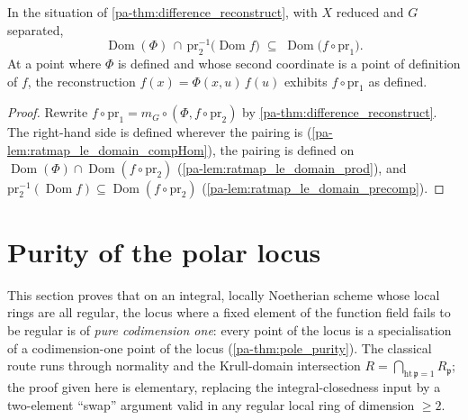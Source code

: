 \begin{theorem}
  \label{pa-thm:difference_domain_reflection}
  \leanok

  In the situation of \ref{pa-thm:difference_reconstruct}, with \(X\) reduced and
  \(G\) separated,
  \[
    \operatorname{Dom}(\Phi) \,\cap\,
    \mathrm{pr}_2^{-1}\bigl(\operatorname{Dom} f\bigr)
    \;\subseteq\;
    \operatorname{Dom}\bigl(f \circ \mathrm{pr}_1\bigr).
  \]
  At a point where \(\Phi\) is defined and whose second coordinate is a point of
  definition of \(f\), the reconstruction \(f(x) = \Phi(x, u)\, f(u)\) exhibits
  \(f \circ \mathrm{pr}_1\) as defined.
\end{theorem}
\begin{proof}
  \leanok
  Rewrite \(f \circ \mathrm{pr}_1 = m_G \circ (\Phi, f \circ \mathrm{pr}_2)\)
  by \ref{pa-thm:difference_reconstruct}. The right-hand side is defined wherever
  the pairing is (\ref{pa-lem:ratmap_le_domain_compHom}), the pairing is defined on
  \(\operatorname{Dom}(\Phi) \cap \operatorname{Dom}(f \circ \mathrm{pr}_2)\)
  (\ref{pa-lem:ratmap_le_domain_prod}), and
  \(\mathrm{pr}_2^{-1}(\operatorname{Dom} f) \subseteq
  \operatorname{Dom}(f \circ \mathrm{pr}_2)\)
  (\ref{pa-lem:ratmap_le_domain_precomp}).
\end{proof}

\section{Purity of the polar locus}
\label{pa-sec:pole_purity}

This section proves that on an integral, locally Noetherian scheme whose local
rings are all regular, the locus where a fixed element of the function field
fails to be regular is of \emph{pure codimension one}: every point of the locus
is a specialisation of a codimension-one point of the locus
(\ref{pa-thm:pole_purity}). The classical route runs through normality and the
Krull-domain intersection \(R = \bigcap_{\mathrm{ht}\,\mathfrak p = 1}
R_{\mathfrak p}\); the proof given here is elementary, replacing the
integral-closedness input by a two-element ``swap'' argument valid in any
regular local ring of dimension \(\geq 2\).

